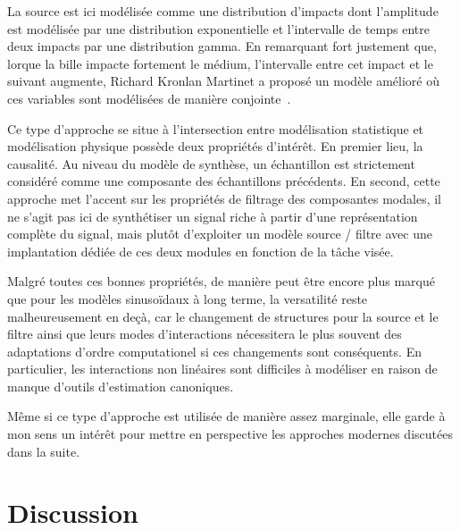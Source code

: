 La source est ici modélisée comme une distribution d'impacts dont l'amplitude est modélisée par une distribution exponentielle et l'intervalle de temps entre deux impacts par une distribution gamma. En remarquant fort justement que, lorque la bille impacte fortement le médium, l'intervalle entre cet impact et le suivant augmente, Richard Kronlan Martinet a proposé un modèle amélioré où ces variables sont modélisées de manière conjointe~\cite{conan2014synthesis}.

Ce type d'approche se situe à l'intersection entre modélisation statistique et modélisation physique possède deux propriétés d'intérêt. En premier lieu, la causalité. Au niveau du modèle de synthèse, un échantillon est strictement considéré comme une composante des échantillons précédents. En second, cette approche met l'accent sur les propriétés de filtrage des composantes modales, il ne s'agit pas ici de synthétiser un signal riche à partir d'une représentation complète du signal, mais plutôt d'exploiter un modèle source / filtre avec une implantation dédiée de ces deux modules en fonction de la tâche visée.


Malgré toutes ces bonnes propriétés, de manière peut être encore plus marqué que pour les modèles sinusoïdaux à long terme, la versatilité reste malheureusement en deçà, car le changement de structures pour la source et le filtre ainsi que leurs modes d'interactions nécessitera le plus souvent des adaptations d'ordre computationel si ces changements sont conséquents. En particulier, les interactions non linéaires sont difficiles à modéliser en raison de manque d'outils d'estimation canoniques.

Même si ce type d'approche est utilisée de manière assez marginale, elle garde à mon sens un intérêt pour mettre en perspective les approches modernes discutées dans la suite.

\section{ \nmu Discussion}

